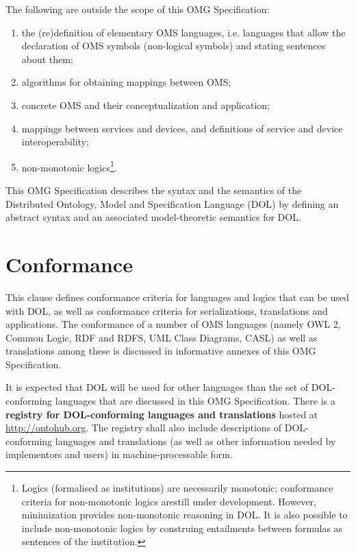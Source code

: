 \documentclass[10pt,fleqn,%
\ifpretendfinal
final%
\else
draft%
\fi,
]{scrreprt}
\makeatletter
\newcommand*{\ie}{i.e.\@\xspace}
\newcommand*\CommentAuthor{}
\renewcommand*\CommentAuthor{#1}}
\newcommand*\CommentDate{}
\renewcommand*\CommentDate{#1}}
\newcommand*\CommentId{}
\renewcommand*\CommentId{#1}}
\newcommand*\CommentType{}
\renewcommand*\CommentType{#1}}
\newcommand*{\SetCommentColorByType}[1]{%
\edef\localType{{#1}}%
\expandafter\ifstrequal\localType{q-aut}{\colorlet{CommentColor}{red}}{%
\expandafter\ifstrequal\localType{q-all}{\colorlet{CommentColor}{orange}}{%
\expandafter\ifstrequal\localType{todo}{\colorlet{CommentColor}{orange}}{%
\expandafter\ifstrequal\localType{fyi}{\colorlet{CommentColor}{lightgray}}{%
\colorlet{CommentColor}{yellow}}}}}}
\newcommand*{\SetCommentPrefixByType}[1]{%
\edef\localType{{#1}}%
\expandafter\@ifmtarg\localType{%
\edef\CommentPrefix{}%
}{%
\caseupper[q]{#1}%
\edef\CommentPrefix{\thestring: }%
}}
\newcommand*{\initComment}[1]{%
\setkeys{Comment}{#1}%
\SetCommentColorByType{\CommentType}%
\relax%
\SetCommentPrefixByType{\CommentType}%
\relax%
}
\newcommand*{\todonote}[2][]{%
\initComment{#1}%
\pdfcomment[author=\CommentAuthor,color=CommentColor,date=\CommentDate,id=\CommentId]{%
\CommentPrefix
#2}}
\renewcommand*{\todonote}[2][]{%
\initComment{#1}%
\ednote{\CommentPrefix #2}}
\newcommand*{\termref}[1]{\index{#1}#1\xspace}
\newcommand*{\IS}{OMG Specification\xspace}
\makeatother
\begin{document}
The following are outside the scope of this \IS:
\begin{enumerate}
\item the (re)definition of elementary OMS languages, \ie languages that allow the declaration of OMS symbols (non-logical symbols) 
and
stating sentences about them;
\item algorithms for obtaining mappings between OMS;
\item concrete OMS and their conceptualization and application;
\item mappings between services and devices, and definitions of service and device interoperability;
\item non-monotonic logics\footnote{Logics (formalised as institutions) are necessarily monotonic; conformance criteria for non-monotonic logics arestill under development. However, minimization provides non-monotonic reasoning in DOL. It is also possible to include non-monotonic logics by construing entailments between formulas as sentences of the institution.}. 

\end{enumerate}

This \IS describes the syntax and the semantics of the Distributed Ontology, Model and
Specification Language (DOL) by defining an abstract syntax and an associated model-theoretic
semantics for DOL. 


\chapter{Conformance}\label{c:conformance}
This clause defines conformance criteria for languages and logics that can be used with DOL, as well as conformance criteria for
serializations, translations and applications. The conformance of a
number of OMS languages (namely OWL 2, Common Logic, RDF and RDFS, UML Class Diagrams, CASL) as well as translations among
these is discussed in informative annexes of this \IS.

It is expected that DOL will be used for other languages than the  set of DOL-conforming
languages that are discussed in this \IS. There is a  \textbf{\termref{registry} for DOL-conforming languages and translations} hosted
at \url{http://ontohub.org}.  The registry shall also include descriptions of
DOL-conforming languages and translations (as well as other information needed by implementors
and users) in machine-processable form.  
\end{document}
